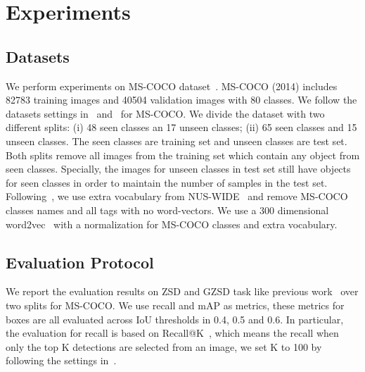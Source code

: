 \documentclass[runningheads]{llncs}
\begin{document}
\section{Experiments}
\subsection{Datasets}
We perform experiments on MS-COCO dataset~\cite{lin2014microsoft}. MS-COCO (2014) includes 82783 training images and 40504 validation images with 80 classes. We follow the datasets settings in~\cite{bansal2018zero} and~\cite{rahman2020improved} for MS-COCO. We divide the dataset with two different splits: (i) 48 seen classes an 17 unseen classes; (ii) 65 seen classes and 15 unseen classes. The seen classes are training set and unseen classes are test set. Both splits remove all images from the training set which contain any object from seen classes. Specially, the images for unseen classes in test set still have objects for seen classes in order to maintain the number of samples in the test set. Following~\cite{rahman2020improved}, we use extra vocabulary from NUS-WIDE~\cite{chua2009nus} and remove MS-COCO classes names and all tags with no word-vectors. We use a 300 dimensional word2vec~\cite{mikolov2013distributed} with a  normalization for MS-COCO classes and extra vocabulary. 
\subsection{Evaluation Protocol}
We report the evaluation results on ZSD and GZSD task like previous work~\cite{bansal2018zero,rahman2020improved} over two splits for MS-COCO. We use recall and mAP as metrics, these metrics for boxes are all evaluated across IoU thresholds in 0.4, 0.5 and 0.6. In particular, the evaluation for recall is based on Recall@K~\cite{bansal2018zero}, which means the recall when only the top K detections are selected from an image, we set K to 100 by following the settings in~\cite{bansal2018zero}.
\end{document}
